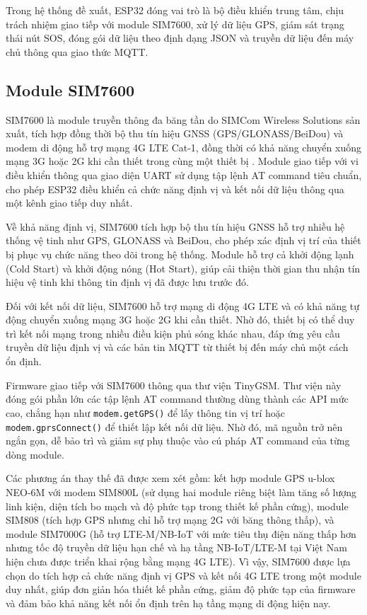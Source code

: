 \documentclass[../DoAn.tex]{subfiles}
\begin{document}
Trong hệ thống đề xuất, ESP32 đóng vai trò là bộ điều khiển trung tâm, chịu trách nhiệm giao tiếp với module SIM7600, xử lý dữ liệu GPS, giám sát trạng thái nút SOS, đóng gói dữ liệu theo định dạng JSON và truyền dữ liệu đến máy chủ thông qua giao thức MQTT.

\subsection{Module SIM7600}
\label{subsection:3.1.2}

SIM7600 là module truyền thông đa băng tần do SIMCom Wireless Solutions sản xuất, tích hợp đồng thời bộ thu tín hiệu GNSS (GPS/GLONASS/BeiDou) và modem di động hỗ trợ mạng 4G LTE Cat-1, đồng thời có khả năng chuyển xuống mạng 3G hoặc 2G khi cần thiết trong cùng một thiết bị \cite{simcom_sim7600}. Module giao tiếp với vi điều khiển thông qua giao diện UART sử dụng tập lệnh AT command tiêu chuẩn, cho phép ESP32 điều khiển cả chức năng định vị và kết nối dữ liệu thông qua một kênh giao tiếp duy nhất.

Về khả năng định vị, SIM7600 tích hợp bộ thu tín hiệu GNSS hỗ trợ nhiều hệ thống vệ tinh như GPS, GLONASS và BeiDou, cho phép xác định vị trí của thiết bị phục vụ chức năng theo dõi trong hệ thống. Module hỗ trợ cả khởi động lạnh (Cold Start) và khởi động nóng (Hot Start), giúp cải thiện thời gian thu nhận tín hiệu vệ tinh khi thông tin định vị đã được lưu trước đó.

Đối với kết nối dữ liệu, SIM7600 hỗ trợ mạng di động 4G LTE và có khả năng tự động chuyển xuống mạng 3G hoặc 2G khi cần thiết. Nhờ đó, thiết bị có thể duy trì kết nối mạng trong nhiều điều kiện phủ sóng khác nhau, đáp ứng yêu cầu truyền dữ liệu định vị và các bản tin MQTT từ thiết bị đến máy chủ một cách ổn định.

Firmware giao tiếp với SIM7600 thông qua thư viện TinyGSM. Thư viện này đóng gói phần lớn các tập lệnh AT command thường dùng thành các API mức cao, chẳng hạn như \texttt{modem.getGPS()} để lấy thông tin vị trí hoặc \texttt{modem.gprsConnect()} để thiết lập kết nối dữ liệu. Nhờ đó, mã nguồn trở nên ngắn gọn, dễ bảo trì và giảm sự phụ thuộc vào cú pháp AT command của từng dòng module.

Các phương án thay thế đã được xem xét gồm: kết hợp module GPS u-blox NEO-6M với modem SIM800L (sử dụng hai module riêng biệt làm tăng số lượng linh kiện, diện tích bo mạch và độ phức tạp trong thiết kế phần cứng), module SIM808 (tích hợp GPS nhưng chỉ hỗ trợ mạng 2G với băng thông thấp), và module SIM7000G (hỗ trợ LTE-M/NB-IoT với mức tiêu thụ điện năng thấp hơn nhưng tốc độ truyền dữ liệu hạn chế và hạ tầng NB-IoT/LTE-M tại Việt Nam hiện chưa được triển khai rộng bằng mạng 4G LTE). Vì vậy, SIM7600 được lựa chọn do tích hợp cả chức năng định vị GPS và kết nối 4G LTE trong một module duy nhất, giúp đơn giản hóa thiết kế phần cứng, giảm độ phức tạp của firmware và đảm bảo khả năng kết nối ổn định trên hạ tầng mạng di động hiện nay.
\end{document}
